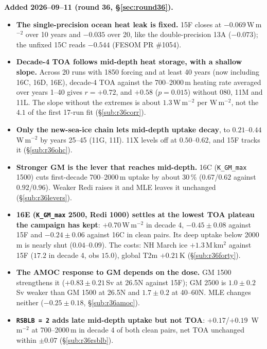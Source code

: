 \documentclass[10pt]{article}
\begin{document}
\textbf{Added 2026--09--11 (round 36, \S\ref{sec:round36}).}
\begin{itemize}\itemsep2pt
\item \textbf{The single-precision ocean heat leak is fixed.} 15F closes at $-0.069$\,W\,m$^{-2}$
over 10 years and $-0.035$ over 20, like the double-precision 13A ($-0.073$); the unfixed 15C
reads $-0.544$ (FESOM PR \#1054).
\item \textbf{Decade-4 TOA follows mid-depth heat storage, with a shallow slope.} Across 20 runs
with 1850 forcing and at least 40 years (now including 16C, 16D, 16E), decade-4 TOA against the
700--2000\,m heating rate averaged over years 1--40 gives $r=+0.72$, and $+0.58$ ($p=0.015$)
without 080, 11M and 11L. The slope without the extremes is about $1.3$\,W\,m$^{-2}$ per
W\,m$^{-2}$, not the $4.1$ of the first 17-run fit (\S\ref{sub:r36corr}).
\item \textbf{Only the new-sea-ice chain lets mid-depth uptake decay}, to $0.21$--$0.44$\,W\,m$^{-2}$
by years 25--45 (11G, 11I). 11X levels off at $0.50$--$0.62$, and 15F tracks it
(\S\ref{sub:r36ohc}).
\item \textbf{Stronger GM is the lever that reaches mid-depth.} 16C (\texttt{K\_GM\_max} 1500)
cuts first-decade 700--2000\,m uptake by about 30\,\% ($0.67$/$0.62$ against $0.92$/$0.96$).
Weaker Redi raises it and MLE leaves it unchanged (\S\ref{sub:r36levers}).
\item \textbf{16E (\texttt{K\_GM\_max} 2500, Redi 1000) settles at the lowest TOA plateau the
campaign has kept}: $+0.70$\,W\,m$^{-2}$ in decade 4, $-0.45\pm0.08$ against 15F and
$-0.24\pm0.06$ against 16C in clean pairs. Its deep uptake below 2000\,m is nearly shut
($0.04$--$0.09$). The costs: NH March ice $+1.3$\,M\,km$^2$ against 15F ($17.2$ in decade 4, obs
$15.0$), global T2m $+0.21$\,K (\S\ref{sub:r36forty}).
\item \textbf{The AMOC response to GM depends on the dose.} GM 1500 strengthens it ($+0.83\pm0.21$\,Sv
at 26.5N against 15F); GM 2500 is $1.0\pm0.2$\,Sv weaker than GM 1500 at 26.5N and $1.7\pm0.2$ at
40--60N. MLE changes neither ($-0.25\pm0.18$, \S\ref{sub:r36amoc}).
\item \textbf{\texttt{RSBLB = 2} adds late mid-depth uptake but not TOA}: $+0.17$/$+0.19$
\,W\,m$^{-2}$ at 700--2000\,m in decade 4 of both clean pairs, net TOA unchanged within
$\pm0.07$ (\S\ref{sub:r36rsblb}).
\end{itemize}
\end{document}

